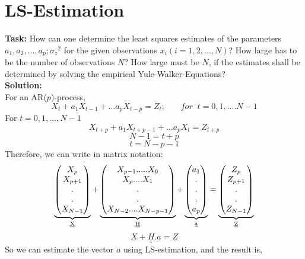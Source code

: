 \section{LS-Estimation}
\noindent \textbf{Task:} How can one determine the least squares estimates of the parameters $a_1 , a_2 ,..., a_p ;{\sigma_z}^2$ for the given observations $x_i ( i = 1,2,...,N )$? How large has to be the number of observations $N$? How large must be $N$, if the estimates shall be determined by solving the empirical Yule-Walker-Equations?
\\
\noindent \textbf{Solution:}\\
\noindent For an AR($p$)-process,
$$ X_{t}+a_1X_{t-1}+...a_pX_{t-p} = Z_t  ;\;\;\;\quad for \;\; t=0,1,....N-1$$
\noindent For $t = 0,1,...,N-1$
$$ X_{t+p}+a_1X_{t+p-1}+...a_pX_{t}=Z_{t+p} $$
$$N-1 = t+p$$
$$t =  N-p-1$$
\noindent Therefore, we can write in matrix notation:
\[
\underbrace{\begin{pmatrix}
X_{p}\\
X_{p+1}\\
.\\
.\\
X_{N-1}\\
\end{pmatrix}}_\text{\underline{X}}
+
\underbrace{\begin{pmatrix}
X_{p-1}.....X_0\\
X_{p}....X_1\\
.\\
.\\
X_{N-2}....X_{N-p-1}\\
\end{pmatrix}}_\text{\underline{H}}
+
\underbrace{\begin{pmatrix}
a_1\\
.\\
.\\
.\\
a_p\\
\end{pmatrix}}_\text{\underline{a}}
=
\underbrace{\begin{pmatrix}
Z_p\\
Z_{p+1}\\
.\\
.\\
Z_{N-1}\\
\end{pmatrix}}_\text{\underline{Z}}
\]
$$\underline{X}+\underline{\underline{H}}.\underline{a} = \underline{Z}$$
\noindent So we can estimate the vector $a$ using LS-estimation, and the result is,
